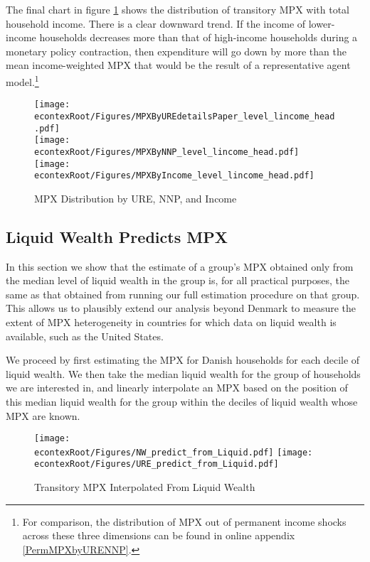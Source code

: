 \documentclass[titlepage]{\econtex}\newcommand{\texname}{ConsumptionHeterogeneity}
\begin{document}
	The final chart in figure \ref{fig:MPCAuclert} shows the distribution of transitory MPX with total household income. There is a clear downward trend. If the income of lower-income households decreases more than that of high-income households during a monetary policy contraction, then expenditure will go down by more than the mean income-weighted MPX that would be the result of a representative agent model.\footnote{For comparison, the distribution of  MPX out of permanent income shocks across these three dimensions can be found in online appendix \ref{PermMPXbyURENNP}.}
	\begin{figure} 
	\begin{centering}
		\texttt{[image: \\econtexRoot/Figures/MPXByUREdetailsPaper\_level\_lincome\_head.pdf]} \\
		\texttt{[image: \\econtexRoot/Figures/MPXByNNP\_level\_lincome\_head.pdf]}
		\texttt{[image: \\econtexRoot/Figures/MPXByIncome\_level\_lincome\_head.pdf]}
		\caption{MPX Distribution by URE, NNP, and Income}
		\label{fig:MPCAuclert}
	\end{centering}
	\end{figure}

	\subsection{Liquid Wealth Predicts MPX}
	\label{liquid_wealth_sufficient}
	In this section we show that the estimate of a group's MPX obtained only from the median level of liquid wealth in the group is, for all practical purposes, the same as that obtained from running our full estimation procedure on that group. This allows us to plausibly extend our analysis beyond Denmark to measure the extent of MPX heterogeneity in countries for which data on liquid wealth is available, such as the United States.

	We proceed by first estimating the MPX for Danish households for each decile of liquid wealth. We then take the median liquid wealth for the group of households we are interested in, and linearly interpolate an MPX based on the position of this median liquid wealth for the group within the deciles of liquid wealth whose MPX are known. 

	\begin{figure}
	\centering
	\texttt{[image: \\econtexRoot/Figures/NW\_predict\_from\_Liquid.pdf]}
	\centering
	\texttt{[image: \\econtexRoot/Figures/URE\_predict\_from\_Liquid.pdf]}
	\caption{Transitory MPX Interpolated From Liquid Wealth}
	\label{fig:MPXPredict}
	\end{figure}
\end{document}
